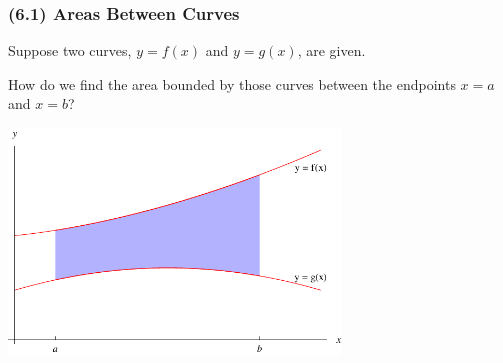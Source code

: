 \begin{frame}
\frametitle{(6.1) Areas Between Curves}
Suppose two curves, $y = f(x)$ and $y = g(x)$, are given.

How do we find the area bounded by those curves between the endpoints $x = a$ and $x = b$?

\includegraphics[height=6cm]{area-between-curves/pictures/06-01-doubleint.pdf}
\end{frame}

